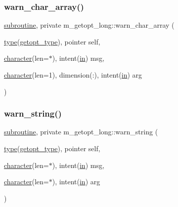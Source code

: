 \subsubsection{\texorpdfstring{warn\+\_\+char\+\_\+array()}{warn\_char\_array()}}
{\footnotesize\ttfamily \hyperlink{M__stopwatch_83_8txt_acfbcff50169d691ff02d4a123ed70482}{subroutine}, private m\+\_\+getopt\+\_\+long\+::warn\+\_\+char\+\_\+array (\begin{DoxyParamCaption}\item[{\hyperlink{stop__watch_83_8txt_a70f0ead91c32e25323c03265aa302c1c}{type}(\hyperlink{structm__getopt__long_1_1getopt__type}{getopt\+\_\+type}), pointer}]{self,  }\item[{\hyperlink{option__stopwatch_83_8txt_abd4b21fbbd175834027b5224bfe97e66}{character}(len=$\ast$), intent(\hyperlink{M__journal_83_8txt_afce72651d1eed785a2132bee863b2f38}{in})}]{msg,  }\item[{\hyperlink{option__stopwatch_83_8txt_abd4b21fbbd175834027b5224bfe97e66}{character}(len=1), dimension(\+:), intent(\hyperlink{M__journal_83_8txt_afce72651d1eed785a2132bee863b2f38}{in})}]{arg }\end{DoxyParamCaption})\hspace{0.3cm}{\ttfamily [private]}}

\mbox{\label{namespacem__getopt__long_a78f4dacb7eae96d7e259544003ae0dfd}} 
\subsubsection{\texorpdfstring{warn\+\_\+string()}{warn\_string()}}
{\footnotesize\ttfamily \hyperlink{M__stopwatch_83_8txt_acfbcff50169d691ff02d4a123ed70482}{subroutine}, private m\+\_\+getopt\+\_\+long\+::warn\+\_\+string (\begin{DoxyParamCaption}\item[{\hyperlink{stop__watch_83_8txt_a70f0ead91c32e25323c03265aa302c1c}{type}(\hyperlink{structm__getopt__long_1_1getopt__type}{getopt\+\_\+type}), pointer}]{self,  }\item[{\hyperlink{option__stopwatch_83_8txt_abd4b21fbbd175834027b5224bfe97e66}{character}(len=$\ast$), intent(\hyperlink{M__journal_83_8txt_afce72651d1eed785a2132bee863b2f38}{in})}]{msg,  }\item[{\hyperlink{option__stopwatch_83_8txt_abd4b21fbbd175834027b5224bfe97e66}{character}(len=$\ast$), intent(\hyperlink{M__journal_83_8txt_afce72651d1eed785a2132bee863b2f38}{in})}]{arg }\end{DoxyParamCaption})\hspace{0.3cm}{\ttfamily [private]}}



